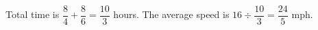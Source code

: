 Total time is $\dfrac{8}{4}+\dfrac{8}{6}=\dfrac{10}{3}$ hours. The average speed is $16\div\dfrac{10}{3}=\boxed{\dfrac{24}{5}}$ mph.
